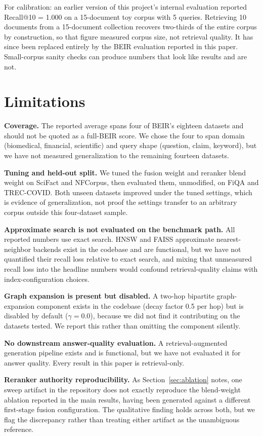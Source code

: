 \documentclass[11pt]{article}
\begin{document}
For calibration: an earlier version of this project's internal evaluation reported Recall@10 = 1.000 on a 15-document toy corpus with 5 queries. Retrieving 10 documents from a 15-document collection recovers two-thirds of the entire corpus by construction, so that figure measured corpus size, not retrieval quality. It has since been replaced entirely by the BEIR evaluation reported in this paper. Small-corpus sanity checks can produce numbers that look like results and are not.

\section{Limitations}
\label{sec:limitations}

\textbf{Coverage.} The reported average spans four of BEIR's eighteen datasets and should not be quoted as a full-BEIR score. We chose the four to span domain (biomedical, financial, scientific) and query shape (question, claim, keyword), but we have not measured generalization to the remaining fourteen datasets.

\textbf{Tuning and held-out split.} We tuned the fusion weight and reranker blend weight on SciFact and NFCorpus, then evaluated them, unmodified, on FiQA and TREC-COVID. Both unseen datasets improved under the tuned settings, which is evidence of generalization, not proof the settings transfer to an arbitrary corpus outside this four-dataset sample.

\textbf{Approximate search is not evaluated on the benchmark path.} All reported numbers use exact search. HNSW and FAISS approximate nearest-neighbor backends exist in the codebase and are functional, but we have not quantified their recall loss relative to exact search, and mixing that unmeasured recall loss into the headline numbers would confound retrieval-quality claims with index-configuration choices.

\textbf{Graph expansion is present but disabled.} A two-hop bipartite graph-expansion component exists in the codebase (decay factor 0.5 per hop) but is disabled by default ($\gamma=0.0$), because we did not find it contributing on the datasets tested. We report this rather than omitting the component silently.

\textbf{No downstream answer-quality evaluation.} A retrieval-augmented generation pipeline exists and is functional, but we have not evaluated it for answer quality. Every result in this paper is retrieval-only.

\textbf{Reranker authority reproducibility.} As Section~\ref{sec:ablation} notes, one sweep artifact in the repository does not exactly reproduce the blend-weight ablation reported in the main results, having been generated against a different first-stage fusion configuration. The qualitative finding holds across both, but we flag the discrepancy rather than treating either artifact as the unambiguous reference.
\end{document}
